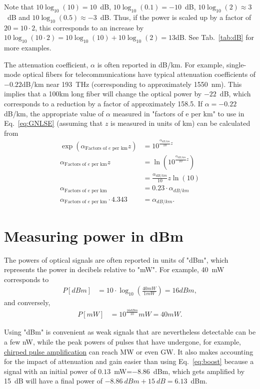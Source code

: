 Note that $10\log_{10}(10)=10$~dB, $10\log_{10}(0.1)=-10$~dB, $10\log_{10}(2)\approx3$~dB and $10\log_{10}(0.5)\approx-3$~dB. Thus, if the power is scaled up by a factor of $20=10\cdot 2$, this corresponds to an increase by $10\log_{10}(10\cdot 2) = 10\log_{10}(10)+10\log_{10}(2) = 13$dB. See Tab.~\ref{tab:dB} for more examples. 

The attenuation coefficient, $\alpha$ is often reported in dB/km. For example, single-mode optical fibers for telecommunications  have typical attenuation coefficients of $-0.22$dB/km near 193~THz (corresponding to approximately 1550~nm). This implies that a 100km long fiber will change the optical power by $-22$~dB, which corresponds to a reduction by a factor of approximately 158.5. If $\alpha=-0.22$dB/km, the appropriate value of $\alpha$ measured in "factors of e per km" to use in Eq.~\ref{eq:GNLSE} (assuming that $z$ is measured in units of km) can be calculated from
\begin{align}
    \exp\left(\alpha_{\text{Factors of $e$ per km}}z\right) &= 10^{ \frac{\alpha_{dB/km}}{10}z} \\ \nonumber
    \alpha_{\text{Factors of $e$ per km}}z &= \ln\left(10^{ \frac{\alpha_{dB/km}}{10}z} \right)\\ \nonumber
    &= \frac{\alpha_{dB/km}}{10}z \ln(10)\\ \nonumber
    \alpha_{\text{Factors of $e$ per km}} &= 0.23\cdot \alpha_{dB/km}\\ \nonumber
    \alpha_{\text{Factors of $e$ per km}}\cdot4.343&=\alpha_{dB/km}.
\end{align}


\section{Measuring power in dBm}
The powers of optical signals are often reported in units of "dBm", which represents the power in decibels relative to "mW". For example, 40~mW corresponds to
\begin{align}
    P [dBm] &= 10\cdot\log_{10}\left(\frac{40mW}{1mW} \right)=16dBm,
\end{align}
and conversely,
\begin{align}
    \label{eq:dBm_rev}
    P [mW] &= 10^{\frac{16dBm}{10}}mW=40mW.
\end{align}


Using "dBm" is convenient as weak signals that are nevertheless detectable can be a few nW, while the peak powers of pulses that have undergone, for example, \href{https://youtu.be/Eh5CHRWFT-M}{chirped pulse amplification} can reach MW or even GW. It also makes accounting for the impact of attenuation and gain easier than using Eq.~\ref{eq:boost} because a signal with an initial power of $0.13$~mW=$-8.86$~dBm, which gets amplified by 15~dB will have a final power of $-8.86~dBm+15~dB=6.13$~dBm.    


